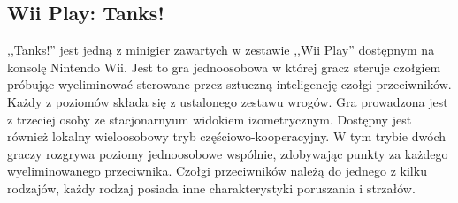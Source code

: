 \subsection{Wii Play: Tanks!}
,,Tanks!'' jest jedną z minigier zawartych w zestawie ,,Wii Play'' dostępnym na konsolę Nintendo Wii\cite{wii_tanks}. Jest to gra jednoosobowa w której gracz steruje czołgiem próbując wyeliminować sterowane przez sztuczną inteligencję czołgi przeciwników. Każdy z poziomów składa się z ustalonego zestawu wrogów. Gra prowadzona jest z trzeciej osoby ze stacjonarnyum widokiem izometrycznym. Dostępny jest również lokalny wieloosobowy tryb częściowo-kooperacyjny. W tym trybie dwóch graczy rozgrywa poziomy jednoosobowe wspólnie, zdobywając punkty za każdego wyeliminowanego przeciwnika. Czołgi przeciwników należą do jednego z kilku rodzajów, każdy rodzaj posiada inne charakterystyki poruszania i strzałów.   
